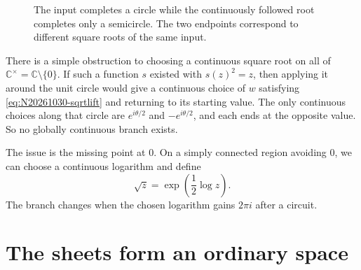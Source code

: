 \begin{figure}[htbp]
\centering
{}
\caption{The input completes a circle while the continuously followed root completes only a semicircle. The two endpoints correspond to different square roots of the same input.}
\label{fig:N20261030-sqrt-loop}
\end{figure}

There is a simple obstruction to choosing a continuous square root on all of \(\mathbb C^\times=\mathbb C\setminus\{0\}\). If such a function \(s\) existed with \(s(z)^2=z\), then applying it around the unit circle would give a continuous choice of \(w\) satisfying \eqref{eq:N20261030-sqrtlift} and returning to its starting value. The only continuous choices along that circle are \(e^{i\theta/2}\) and \(-e^{i\theta/2}\), and each ends at the opposite value. So no globally continuous branch exists.

The issue is the missing point at \(0\). On a simply connected region avoiding \(0\), we can choose a continuous logarithm and define
\[
 \sqrt z=\exp\left(\frac12\log z\right).
\]
The branch changes when the chosen logarithm gains \(2\pi i\) after a circuit.

\section{The sheets form an ordinary space}

